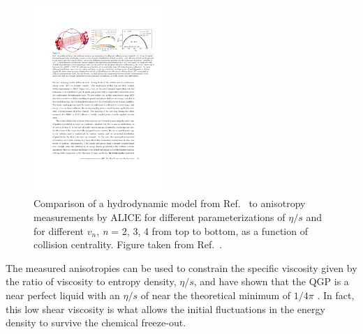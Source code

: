 \begin{figure}[htbp]
\begin{center}
\includegraphics[width=0.45\textwidth]{figures/theory/flow_coefficients}
\caption{Comparison of a hydrodynamic model from Ref.~\cite{Niemi:2015qia} to anisotropy measurements by ALICE \cite{ALICE:2011ab} for different parameterizations of $\eta / s $ and for different $v_n$, {\it{n}} = 2, 3, 4 from top to bottom, as a function of collision centrality.
Figure taken from Ref.~\cite{Busza:2018rrf}.}
\label{fig:flow_coeff}
\end{center}
\end{figure}

The measured anisotropies can be used to constrain the specific viscosity given by the ratio of viscosity to entropy density, $\eta / s$, and have shown that the QGP is a near perfect liquid with an $\eta / s$ of near the theoretical minimum of $1/4\pi$ \cite{ARSENE20051, GYULASSY200530}.
In fact, this low shear viscosity is what allows the initial fluctuations in the energy density to survive the chemical freeze-out.

























